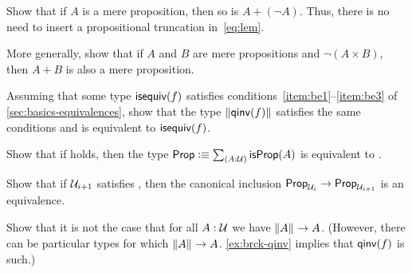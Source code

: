 \begin{ex}\label{ex:lem-mereprop}
  Show that if $A$ is a mere proposition, then so is $A+(\neg A)$.
  Thus, there is no need to insert a propositional truncation in~\eqref{eq:lem}.
\end{ex}

\begin{ex}\label{ex:disjoint-or}
  More generally, show that if $A$ and $B$ are mere propositions and $\neg(A\times B)$, then $A+B$ is also a mere proposition.
\end{ex}




\begin{ex}\label{ex:brck-qinv}
  Assuming that some type $\mathsf{isequiv}(f)$ satisfies conditions~\ref{item:be1}--\ref{item:be3} of \cref{sec:basics-equivalences}, show that the type $\mathopen{}\left\Vert \mathsf{qinv}(f)\right\Vert_{}\mathclose{}$ satisfies the same conditions and is equivalent to $\mathsf{isequiv}(f)$.
\end{ex}

\begin{ex}\label{ex:lem-impl-prop-equiv-bool}
  Show that if \LEM{} holds, then the type $\prop \defeq \sm{A:\type} \isprop(A)$ is equivalent to \bool.
\end{ex}

\begin{ex}\label{ex:lem-impred}
  Show that if $\mathcal{U}_{i+1}$ satisfies \LEM{}, then the canonical inclusion $\mathsf{Prop}_{\mathcal{U}_i} \to \mathsf{Prop}_{\mathcal{U}_{i+1}}$ is an equivalence.
\end{ex}

\begin{ex}\label{ex:not-brck-A-impl-A}
  Show that it is not the case that for all $A:\mathcal{U}$ we have $\mathopen{}\left\Vert A\right\Vert_{}\mathclose{} \to A$.
  (However, there can be particular types for which $\mathopen{}\left\Vert A\right\Vert_{}\mathclose{}\to A$.
  \cref{ex:brck-qinv} implies that $\mathsf{qinv}(f)$ is such.)
\end{ex}

